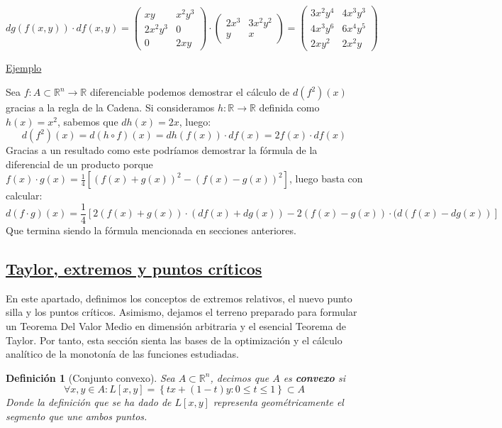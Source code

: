 \documentclass[10pt,a4paper,openright]{book}
\theoremstyle{break}
\newtheorem*{defi}{Definición}
\begin{document}
$$d g (f(x,y)) \cdot df(x,y) = \begin{pmatrix}
xy & x^2 y^3 \\ 2x^2y^3 & 0 \\ 0 & 2xy
\end{pmatrix} \cdot  \begin{pmatrix}
2x^3 & 3x^2y^2 \\ y & x
\end{pmatrix} = \begin{pmatrix}
3x^2y^4 & 4x^3y^3 \\ 4x^3y^6 & 6x^4y^5 \\ 2xy^2 & 2x^2y
\end{pmatrix}$$

\underline{Ejemplo}

Sea $f: A \subset \mathbb{R}^n \to \mathbb{R}$ diferenciable podemos demostrar el cálculo de $d(f^2)(x)$ gracias a la regla de la Cadena.
Si consideramos $h: \mathbb{R} \to \mathbb{R}$ definida como $h(x)=x^2$, sabemos que $dh(x) = 2x$, luego:
$$d(f^2)(x) = d(h \circ f)(x) = d h(f(x)) \cdot df(x) = 2 f(x) \cdot df(x)$$
Gracias a un resultado como este podríamos demostrar la fórmula de la diferencial de un producto porque $f(x)\cdot g(x) = \frac{1}{4} [(f(x) + g(x))^2 - (f(x) - g(x))^2]$, luego basta con calcular:
$$d(f \cdot g) (x) = \frac{1}{4}\left[ 2 (f(x) + g(x)) \cdot (df(x) + dg(x)) - 2 (f(x) - g(x)) \cdot (d(f(x) - dg(x)) \right]$$
Que termina siendo la fórmula mencionada en secciones anteriores.

\subsection*{\underline{Taylor, extremos y puntos críticos}}
En este apartado, definimos los conceptos de extremos relativos, el nuevo punto silla y los puntos críticos. Asimismo, dejamos el terreno preparado para formular un Teorema Del Valor Medio en dimensión arbitraria y el esencial Teorema de Taylor. Por tanto, esta sección sienta las bases de la optimización y el cálculo analítico de la monotonía de las funciones estudiadas.

\begin{defi}[Conjunto convexo]
Sea $A \subset \mathbb{R}^n$, decimos que $A$ es \textbf{convexo} si 
$$\forall x,y \in A : L[x,y] = \left\lbrace tx + (1-t) y : 0 \leq t \leq 1 \right\rbrace \subset A$$
Donde la definición que se ha dado de $L[x,y]$ representa geométricamente el segmento que une ambos puntos.
\end{defi}
\end{document}
